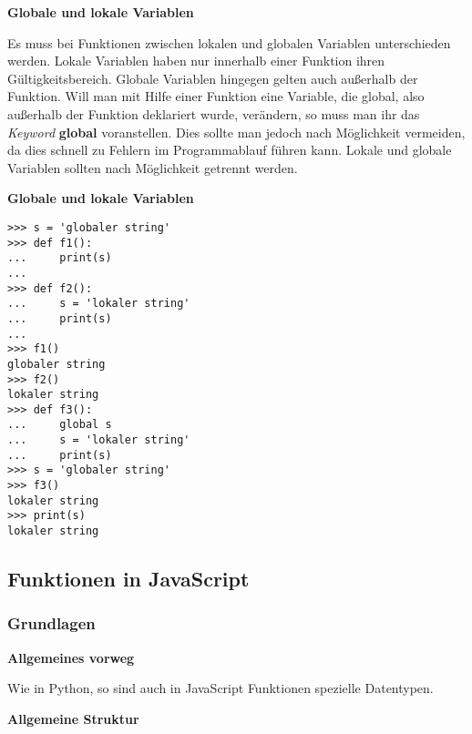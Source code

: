 \vspace{0.5cm}\par\noindent\textbf{Globale und lokale Variablen}\vspace{0.5cm}

Es muss bei Funktionen zwischen lokalen und globalen Variablen
unterschieden werden. Lokale Variablen haben nur innerhalb einer
Funktion ihren Gültigkeitsbereich. Globale Variablen hingegen gelten
auch außerhalb der Funktion. Will man mit Hilfe einer Funktion eine
Variable, die global, also außerhalb der Funktion deklariert wurde,
verändern, so muss man ihr das \emph{Keyword} \textbf{global}
voranstellen. Dies sollte man jedoch nach Möglichkeit vermeiden, da dies
schnell zu Fehlern im Programmablauf führen kann. Lokale und globale
Variablen sollten nach Möglichkeit getrennt werden.



\vspace{0.5cm}\par\noindent\textbf{Globale und lokale Variablen}\vspace{0.5cm}

\begin{verbatim}
>>> s = 'globaler string'
>>> def f1():
...     print(s)
...
>>> def f2():
...     s = 'lokaler string'
...     print(s)
...
>>> f1()
globaler string
>>> f2()
lokaler string
>>> def f3():
...     global s
...     s = 'lokaler string'
...     print(s)
>>> s = 'globaler string'
>>> f3()
lokaler string
>>> print(s)
lokaler string
\end{verbatim}

\subsection{Funktionen in JavaScript}

\subsubsection{Grundlagen}

\vspace{0.5cm}\par\noindent\textbf{Allgemeines vorweg}\vspace{0.5cm}

Wie in Python, so sind auch in JavaScript Funktionen spezielle
Datentypen.

\vspace{0.5cm}\par\noindent\textbf{Allgemeine Struktur}\vspace{0.5cm}

